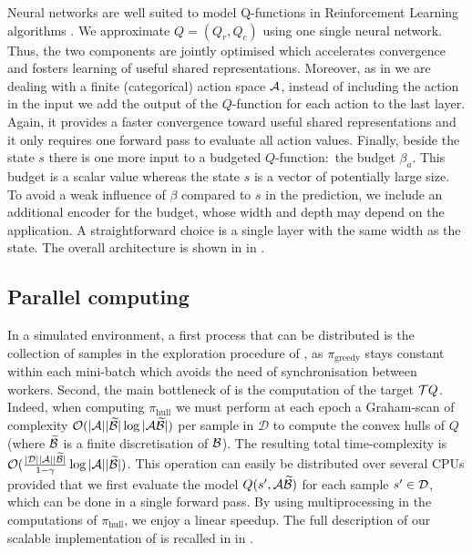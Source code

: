 \documentclass{article}
\begin{document}
Neural networks are well suited to model Q-functions in Reinforcement Learning algorithms \citep{Riedmiller2005,Mnih2015}.  We approximate $Q = (Q_r, Q_c)$ using one single neural network. Thus, the two components are jointly optimised which accelerates convergence and fosters learning of useful shared representations. Moreover, as in \citep{Mnih2015} we are dealing with a finite (categorical) action space $\mathcal{A}$, instead of including the action in the input we add the output of the $Q$-function for each action to the last layer. Again, it provides a faster convergence toward useful shared representations and it only requires one forward pass to evaluate all action values. Finally, beside the state $s$ there is one more input to a budgeted $Q$-function:~the budget $\beta_a$. This budget is a scalar value whereas the state $s$ is a vector of potentially large size. To avoid a weak influence of $\beta$ compared to $s$ in the prediction, we include an additional encoder for the budget, whose width and depth may depend on the application. A straightforward choice is a single layer with the same width as the state. The overall architecture is shown in  in .

\subsection{Parallel computing}
\label{subsec:parallel-computing}
In a simulated environment, a first process that can be distributed is the collection of samples in the exploration procedure of , as $\pi_\text{greedy}$ stays constant within each mini-batch which avoids the need of synchronisation between workers. Second, the main bottleneck of \BFTQ is the computation of the target $\mathcal{T} Q$. Indeed, when computing $\pi_\text{hull}$ we must perform at each epoch a Graham-scan of complexity $\mathcal{O}(|\mathcal{A}||\widetilde{\mathcal{B}}| \log |\mathcal{A}\widetilde{\mathcal{B}}|)$ per sample in $\mathcal{D}$ to compute the convex hulls of $Q$ (where $\widetilde{\mathcal{B}}$ is a finite discretisation of $\mathcal{B}$). The resulting total time-complexity is $\mathcal{O}(\frac{|\mathcal{D}||\mathcal{A}||\widetilde{\mathcal{B}}|}{1-\gamma} \log |\mathcal{A}||\widetilde{\mathcal{B}}|)$. This operation can easily be distributed over several CPUs provided that we first evaluate the model $Q(s',\mathcal{A}\widetilde{\mathcal{B}})$ for each sample $s'\in\mathcal{D}$, which can be done in a single forward pass. By using multiprocessing in the computations of $\pi_\text{hull}$, we enjoy a linear speedup.
The full description of our scalable implementation of \BFTQ is recalled in  in .
\end{document}
